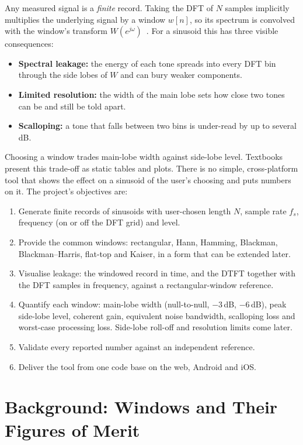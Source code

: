 \documentclass[11pt,a4paper]{article}
\begin{document}
Any measured signal is a \emph{finite} record. Taking the DFT of $N$ samples implicitly
multiplies the underlying signal by a window $w[n]$, so its spectrum is convolved with the
window's transform $W(e^{j\omega})$~\cite{oppenheim}. For a sinusoid this has three visible consequences:
\begin{itemize}
  \item \textbf{Spectral leakage:} the energy of each tone spreads into every DFT bin through
        the side lobes of $W$ and can bury weaker components.
  \item \textbf{Limited resolution:} the width of the main lobe sets how close two tones can be
        and still be told apart.
  \item \textbf{Scalloping:} a tone that falls between two bins is under-read by up to several dB.
\end{itemize}
Choosing a window trades main-lobe width against side-lobe level. Textbooks present this
trade-off as static tables and plots. There is no simple, cross-platform tool that shows the
effect on a sinusoid of the user's choosing and puts numbers on it. The project's objectives are:
\begin{enumerate}[label=\textbf{O\arabic*.}, leftmargin=2.6em]
  \item Generate finite records of sinusoids with user-chosen length $N$, sample rate $f_s$,
        frequency (on or off the DFT grid) and level.
  \item Provide the common windows: rectangular, Hann, Hamming, Blackman, Blackman--Harris,
        flat-top and Kaiser, in a form that can be extended later.
  \item Visualise leakage: the windowed record in time, and the DTFT together with the DFT
        samples in frequency, against a rectangular-window reference.
  \item Quantify each window: main-lobe width (null-to-null, $-3$\,dB, $-6$\,dB), peak
        side-lobe level, coherent gain, equivalent noise bandwidth, scalloping loss and
        worst-case processing loss. Side-lobe roll-off and resolution limits come later.
  \item Validate every reported number against an independent reference.
  \item Deliver the tool from one code base on the web, Android and iOS.
\end{enumerate}

\section{Background: Windows and Their Figures of Merit}
\end{document}

